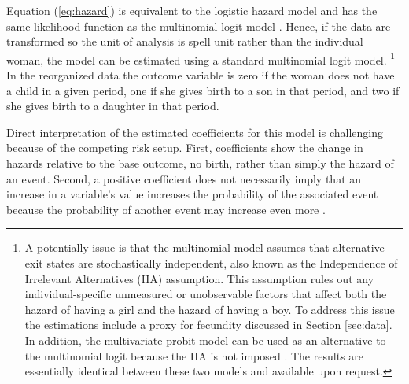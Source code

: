 \documentclass[12pt,letterpaper]{article}
\begin{document}
Equation (\ref{eq:hazard}) is equivalent to the logistic hazard model and has the same 
likelihood function as the multinomial logit model \citep{allison82,jenkins95}.
Hence, if the data are transformed so the unit of analysis is spell unit rather 
than the individual woman, the model can be estimated using a standard multinomial logit model.%
\footnote{
A potentially issue is that the multinomial model assumes that alternative 
exit states are stochastically independent,
also known as the Independence of Irrelevant Alternatives (IIA) assumption.
This assumption rules out any individual-specific unmeasured or 
unobservable factors that affect both the hazard of having a girl and the 
hazard of having a boy.
To address this issue the estimations include a proxy for fecundity
discussed in Section \ref{sec:data}.
In addition, the multivariate probit model can be used as an alternative
to the multinomial logit because the IIA is not imposed \citep{han90}.
The results are essentially identical between these two models and
available upon request.
}
In the reorganized data the outcome variable is zero if the
woman does not have a child in a given period, one if she gives birth to a son in that period,
and two if she gives birth to a daughter in that period.

Direct interpretation of the estimated coefficients for this model is challenging because 
of the competing risk setup.
First, coefficients show the change in hazards relative to the base outcome, no birth, 
rather than simply the hazard of an event.
Second, a positive coefficient does not necessarily imply that an increase in a
variable's value increases the probability of the associated event because the 
probability of another event may increase even more \citep{thomas96}.
\end{document}

